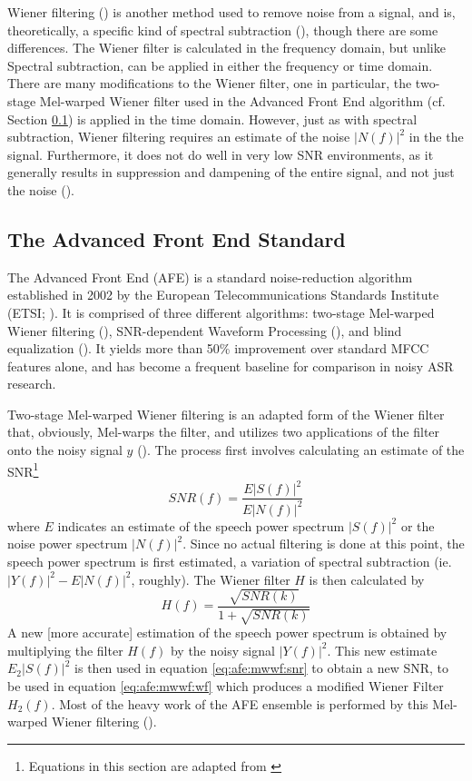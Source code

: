 Wiener filtering (\cite{lim:79}) is another method used to remove noise from a signal, and is, theoretically, a specific kind of spectral subtraction (\cite{agarwal:99}), though there are some differences. The Wiener filter is calculated in the frequency domain, but unlike Spectral subtraction, can be applied in either the frequency or time domain. There are many modifications to the Wiener filter, one in particular, the two-stage Mel-warped Wiener filter used in the Advanced Front End algorithm (cf. Section \ref{sec:background-afe}) is applied in the time domain.
However, just as with spectral subtraction, Wiener filtering requires an estimate of the noise $|N(f)|^2$ in the the signal.  Furthermore, it does not do well in very low SNR environments, as it generally results in suppression and dampening of the entire signal, and not just the noise (\cite{li:14}).


\subsection{The Advanced Front End Standard}\label{sec:background-afe}

The Advanced Front End (AFE) is a standard noise-reduction algorithm established in 2002 by the European Telecommunications Standards Institute (ETSI; \cite{etsi:02}).  It is comprised of three different algorithms: two-stage Mel-warped Wiener filtering (\cite{agarwal:99}), SNR-dependent Waveform Processing (\cite{macho:01}), and blind equalization (\cite{mauuary:98}).  It yields more than 50\% improvement over standard MFCC features alone, and has become a frequent baseline for comparison in noisy ASR research.

Two-stage Mel-warped Wiener filtering is an adapted form of the Wiener filter that, obviously, Mel-warps the filter, and utilizes two applications of the filter onto the noisy signal $y$ (\cite{etsi:02}).  The process first involves calculating an estimate of the SNR\footnote{Equations in this section are adapted from \cite{etsi:02}} \begin{equation}\label{eq:afe:mwwf:snr} SNR(f) = \dfrac{E|S(f)|^2}{E|N(f)|^2} \end{equation} where $E$ indicates an estimate of the speech power spectrum $|S(f)|^2$ or the noise power spectrum $|N(f)|^2$.  Since no actual filtering is done at this point, the speech power spectrum is first estimated, a variation of spectral subtraction (ie. $|Y(f)|^2 - E|N(f)|^2$, roughly).  The Wiener filter $H$ is then calculated by \begin{equation}\label{eq:afe:mwwf:wf} H(f) = \dfrac{\sqrt{SNR(k)}}{1+\sqrt{SNR(k)}} \end{equation}  A new [more accurate] estimation of the speech power spectrum is obtained by multiplying the filter $H(f)$ by the noisy signal $|Y(f)|^2$.  This new estimate $E_2|S(f)|^2$ is then used in equation \ref{eq:afe:mwwf:snr} to obtain a new SNR, to be used in equation \ref{eq:afe:mwwf:wf} which produces a modified Wiener Filter $H_2(f)$.  Most of the heavy work of the AFE ensemble is performed by this Mel-warped Wiener filtering (\cite{li:14}).

